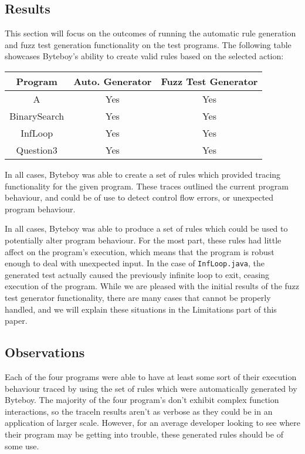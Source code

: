 \documentclass[letterpaper,twocolumn,10pt]{article}
\begin{document}
\subsection{Results}

This section will focus on the outcomes of running the automatic rule generation and fuzz test generation functionality on the test programs. The following table showcases Byteboy's ability to create valid rules based on the selected action:
\begin{center}
 \begin{tabular}{||c | c | c||} 
 \hline
 Program & Auto. Generator & Fuzz Test Generator\\ [0.5ex] 
 \hline\hline
 A & Yes & Yes\\ 
 \hline
 BinarySearch & Yes & Yes\\
 \hline
 InfLoop & Yes & Yes\\
 \hline
 Question3 & Yes & Yes\\ [1ex] 
 \hline
\end{tabular}
\end{center}

In all cases, Byteboy was able to create a set of rules which provided tracing functionality for the given program. These traces outlined the current program behaviour, and could be of use to detect control flow errors, or unexpected program behaviour.

In all cases, Byteboy was able to produce a set of rules which could be used to potentially alter program behaviour. For the most part, these rules had little affect on the program's execution, which means that the program is robust enough to deal with unexpected input. In the case of {\tt InfLoop.java}, the generated test actually caused the previously infinite loop to exit, ceasing execution of the program. While we are pleased with the initial results of the fuzz test generator functionality, there are many cases that cannot be properly handled, and we will explain these situations in the Limitations part of this paper. 

\subsection{Observations}

Each of the four programs were able to have at least some sort of their execution behaviour traced by using the set of rules which were automatically generated by Byteboy. The majority of the four program's don't exhibit complex function interactions, so the traceln results aren't as verbose as they could be in an application of larger scale. However, for an average developer looking to see where their program may be getting into trouble, these generated rules should be of some use.
\end{document}
